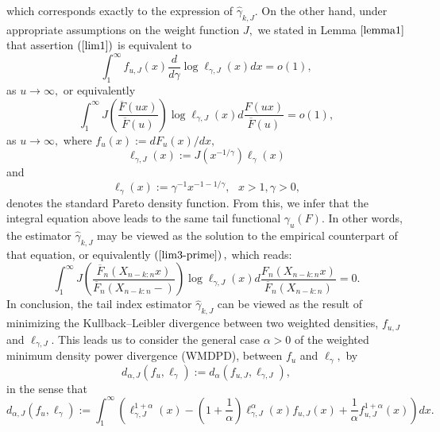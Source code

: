 \documentclass[12pt,reqno,openbib,runningheads,a4paper,portrait]{amsart}%
\begin{document}
which corresponds exactly to the expression of $\widehat{\gamma}_{k,J}.$ On
the other hand, under appropriate assumptions on the weight function $J,$ we
stated in Lemma $\ref{lemma1}$ that assertion $\left(  \ref{lim1}\right)  $ is
equivalent to%
\begin{equation}
\int_{1}^{\infty}f_{u,J}\left(  x\right)  \dfrac{d}{d\gamma}\log\ell
_{\gamma,J}\left(  x\right)  dx=o\left(  1\right)  , \label{lim3}%
\end{equation}
as $u\rightarrow\infty,$ or equivalently
\begin{equation}
\int_{1}^{\infty}J\left(  \dfrac{\overline{F}\left(  ux\right)  }{\overline
{F}\left(  u\right)  }\right)  \log\ell_{\gamma,J}\left(  x\right)
d\dfrac{F\left(  ux\right)  }{\overline{F}\left(  u\right)  }=o\left(
1\right)  , \label{lim3-prime}%
\end{equation}
as $u\rightarrow\infty,$ where $f_{u}\left(  x\right)  :=dF_{u}\left(
x\right)  /dx,$
\begin{equation}
\ell_{\gamma,J}\left(  x\right)  :=J\left(  x^{-1/\gamma}\right)  \ell
_{\gamma}\left(  x\right)  \label{l-J-gamma}%
\end{equation}
and
\begin{equation}
\ell_{\gamma}\left(  x\right)  :=\gamma^{-1}x^{-1-1/\gamma},\text{ }x>1,\text{
}\gamma>0, \label{l-gamma}%
\end{equation}
denotes the standard Pareto density function. From this, we infer that the
integral equation above leads to the same tail functional $\gamma_{u}\left(
F\right)  .$ In other words, the estimator $\widehat{\gamma}_{k,J}$ may be
viewed as the solution to the empirical counterpart of that equation, or
equivalently $\left(  \ref{lim3-prime}\right)  ,$ which reads:%
\[
\int_{1}^{\infty}J\left(  \dfrac{\overline{F}_{n}\left(  X_{n-k:n}x\right)
}{\overline{F}_{n}\left(  X_{n-k:n}-\right)  }\right)  \log\ell_{\gamma
,J}\left(  x\right)  d\dfrac{F_{n}\left(  X_{n-k:n}x\right)  }{\overline
{F}_{n}\left(  X_{n-k:n}\right)  }=0.
\]
In conclusion, the tail index estimator $\widehat{\gamma}_{k,J}$ can be viewed
as the result of minimizing the Kullback--Leibler divergence between two
weighted densities, $f_{u,J}$ and $\ell_{\gamma,J}.$ This leads us to consider
the general case $\alpha>0$ of the weighted minimum density power divergence
(WMDPD), between $f_{u}$ and $\ell_{\gamma},$ by
\[
d_{\alpha,J}\left(  f_{u},\ell_{\gamma}\right)  :=d_{\alpha}\left(
f_{u,J},\ell_{\gamma,J}\right)  ,
\]
in the sense that
\begin{equation}
d_{\alpha,J}\left(  f_{u},\ell_{\gamma}\right)  :=\int_{1}^{\infty}\left(
\ell_{\gamma,J}^{1+\alpha}\left(  x\right)  -\left(  1+\dfrac{1}{\alpha
}\right)  \ell_{\gamma,J}^{\alpha}\left(  x\right)  f_{u,J}\left(  x\right)
+\dfrac{1}{\alpha}f_{u,J}^{1+\alpha}\left(  x\right)  \right)  dx.
\label{WMDPD}%
\end{equation}
\end{document}

